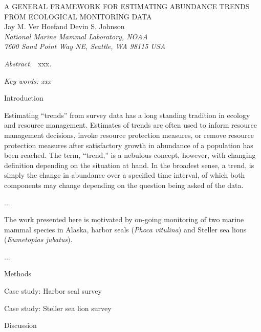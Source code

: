 \documentclass[12pt,letter]{report}
\begin{document}
\begin{center}
\Large A GENERAL FRAMEWORK FOR ESTIMATING ABUNDANCE TRENDS FROM ECOLOGICAL MONITORING DATA
\bigskip\\
\normalsize
{\sc Jay M. Ver Hoef\footnotemark[1] and Devin S. Johnson}\smallskip\\
{\em National Marine Mammal Laboratory, NOAA\\
7600 Sand Point Way NE, Seattle,
WA 98115 USA }\\ \medskip
\end{center}

\raggedright \setlength{\parindent}{0.3in}
\renewcommand{\baselinestretch}{1.7}\normalsize
{}
 \linenumbers

{\em Abstract.\ } xxx.

{\em Key words: xxx}

\centerline{\sc Introduction}

Estimating ``trends'' from survey data has a long standing tradition in ecology and resource management. Estimates of trends are often used to inform resource management decisions, invoke resource protection measures, or remove resource protection measures after satisfactory growth in abundance of a population has been reached. The term, ``trend,'' is a nebulous concept, however, with changing definition depending on the situation at hand. In the broadest sense, a trend, is simply the change in abundance over a specified time interval, of which both components may change depending on the question being asked of the data.   

...

The work presented here is motivated by on-going monitoring of two marine mammal species in Alaska, harbor seals ({\it Phoca vitulina}) and Steller sea lions ({\it Eumetopias jubatus}).

...
   
\centerline{\sc Methods}

\centerline{\sc Case study: Harbor seal survey}

\centerline{\sc Case study: Steller sea lion survey}

\centerline{\sc Discussion}
\end{document}
